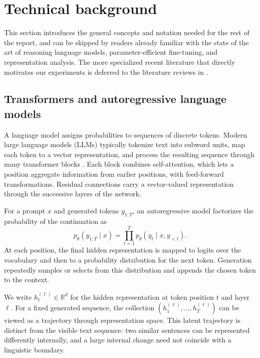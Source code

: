 \section{Technical background}
\label{sec:background}

This section introduces the general concepts and notation needed for the rest of the report, and can be skipped by readers already familiar with the state of the art of reasoning language models, parameter-efficient fine-tuning, and representation analysis. The more specialized recent literature that directly motivates our experiments is deferred to the literature reviews in .

\subsection{Transformers and autoregressive language models}

A language model assigns probabilities to sequences of discrete tokens. Modern large language models (LLMs) typically tokenize text into subword units, map each token to a vector representation, and process the resulting sequence through many transformer blocks \parencite{vaswani2017attention}. Each block combines self-attention, which lets a position aggregate information from earlier positions, with feed-forward transformations. Residual connections carry a vector-valued representation through the successive layers of the network.

For a prompt $x$ and generated tokens $y_{1:T}$, an autoregressive model factorizes the probability of the continuation as
\begin{equation}
    p_\theta(y_{1:T}\mid x)
    = \prod_{t=1}^{T} p_\theta(y_t\mid x,y_{<t}).
\end{equation}
At each position, the final hidden representation is mapped to logits over the vocabulary and then to a probability distribution for the next token. Generation repeatedly samples or selects from this distribution and appends the chosen token to the context.

We write $h_t^{(\ell)}\in\mathbb{R}^d$ for the hidden representation at token position $t$ and layer $\ell$. For a fixed generated sequence, the collection $(h_1^{(\ell)},\ldots,h_T^{(\ell)})$ can be viewed as a trajectory through representation space. This latent trajectory is distinct from the visible text sequence: two similar sentences can be represented differently internally, and a large internal change need not coincide with a linguistic boundary.

